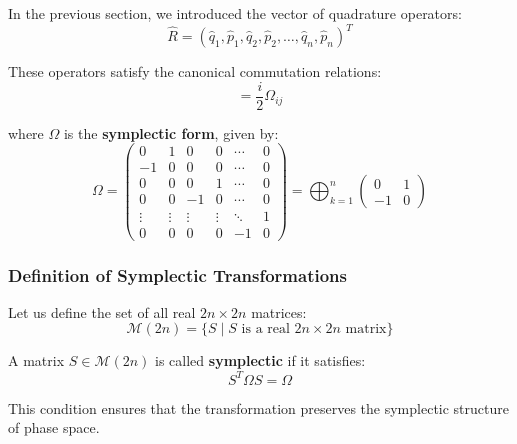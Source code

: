In the previous section, we introduced the vector of quadrature operators:
\begin{equation*}
\hat{R} = (\hat{q}_1, \hat{p}_1, \hat{q}_2, \hat{p}_2, \dots, \hat{q}_n, \hat{p}_n)^T
\end{equation*}

These operators satisfy the canonical commutation relations:
\begin{equation*}
[\hat{R}_i, \hat{R}_j] = \frac{i}{2} \Omega_{ij}
\end{equation*}

where $\Omega$ is the \textbf{symplectic form}, given by:
\begin{equation*}
\Omega =
\begin{pmatrix}
0 & 1 & 0 & 0 & \cdots & 0 \\
-1 & 0 & 0 & 0 & \cdots & 0 \\
0 & 0 & 0 & 1 & \cdots & 0 \\
0 & 0 & -1 & 0 & \cdots & 0 \\
\vdots & \vdots & \vdots & \vdots & \ddots & 1 \\
0 & 0 & 0 & 0 & -1 & 0
\end{pmatrix}
=
\bigoplus_{k=1}^{n}
\begin{pmatrix}
0 & 1 \\
-1 & 0
\end{pmatrix}
\end{equation*}

\vspace{0.5em}

\subsubsection{Definition of Symplectic Transformations}

Let us define the set of all real $2n \times 2n$ matrices:
\begin{equation*}
\mathcal{M}(2n) = \{ S \mid S \text{ is a real } 2n \times 2n \text{ matrix} \}
\end{equation*}

A matrix $S \in \mathcal{M}(2n)$ is called \textbf{symplectic} if it satisfies:
\begin{equation}
S^T \Omega S = \Omega
\label{symplectic_condition}
\end{equation}

This condition ensures that the transformation preserves the symplectic structure of phase space.

\vspace{0.5em}

